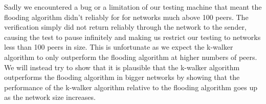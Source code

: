 Sadly we encountered a bug or a limitation of our testing machine that meant the flooding algorithm didn't reliably for for networks much above 100 peers. The verification simply did not return reliably through the network to the sender, causing the test to pause infinitely and making us restrict our testing to networks less than 100 peers in size. This is unfortunate as we expect the k-walker algorithm to only outperform the flooding algorithm at higher numbers of peers. We will instead try to show that it is plausible that the k-walker algorithm outperforms the flooding algorithm in bigger networks by showing that the performance of the k-walker algorithm relative to the flooding algorithm goes up as the network size increases.
